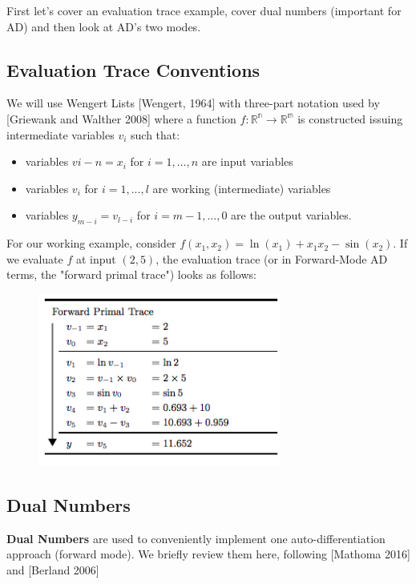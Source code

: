\documentclass[11pt]{article}
\theoremstyle{definition}
\theoremstyle{plain}
\renewcommand{\b}[1]{\mathbb{#1}}
\begin{document}
\noindent First let's cover an evaluation trace example, cover dual numbers (important for AD) 
and then look at AD's two modes.

\newpage

\subsection{Evaluation Trace Conventions}

We will use Wengert Lists [Wengert, 1964] with three-part notation used by 
[Griewank and Walther 2008] where a function $f: \b{R^n} \rightarrow \b{R^m}$ 
is constructed issuing intermediate variables $v_i$ such that:

\begin{itemize}
    \item variables $v{i-n} = x_i$ for $i=1,...,n$ are input variables
    \item variables $v_i$ for $i=1,...,l$ are working (intermediate) variables
    \item variables $y_{m-i} = v_{l-i}$ for $i=m-1,...,0$ are the output variables.
\end{itemize}

\noindent For our working example, consider $f(x_1,x_2) = \ln(x_1) + x_1x_2 - \sin(x_2)$. 
If we evaluate $f$ at input $(2,5)$, the evaluation trace (or in Forward-Mode AD terms,
the "forward primal trace") looks as follows:

\begin{figure}[H]
\includegraphics[width=8cm]{forward}
\centering
\end{figure}

\newpage

\subsection{Dual Numbers}

\noindent \textbf{Dual Numbers} are used to conveniently implement
one auto-differentiation approach (forward mode). We briefly review them
here, following [Mathoma 2016] and [Berland 2006]\\
\end{document}
